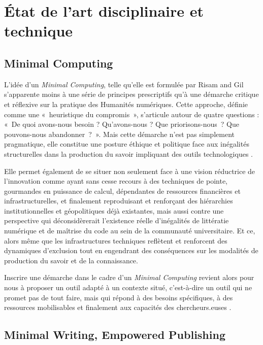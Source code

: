 \documentclass[final, fra]{anthology-ch}      %
\begin{document}
\section{État de l'art disciplinaire et
technique}\label{uxe9tat-de-lart-disciplinaire-et-technique}

\subsection{Minimal Computing}\label{minimal-computing}

L'idée d'un \emph{Minimal Computing}, telle qu'elle est formulée par
Risam and Gil \cite{risamIntroductionQuestionsMinimal2022} s'apparente
moins à une série de principes prescriptifs qu'à une démarche critique
et réflexive sur la pratique des Humanités numériques. Cette approche,
définie comme une «~heuristique du compromis~», s'articule autour de
quatre questions : «~De quoi avons-nous besoin ? Qu'avons-nous ? Que
priorisons-nous~? Que pouvons-nous abandonner~?~». Mais cette
démarche n'est pas simplement pragmatique, elle constitue une posture
éthique et politique face aux inégalités structurelles dans la
production du savoir impliquant des outils technologiques \cite{wrisleyEnactingOpenScholarship2019}.

Elle permet également de se situer non seulement face à une vision
réductrice de l'innovation comme ayant sans cesse recours à des
techniques de pointe, gourmandes en puissance de calcul, dépendantes de
ressources financières et infrastructurelles, et finalement reproduisant
et renforçant des hiérarchies institutionnelles et géopolitiques déjà
existantes, mais aussi contre une perspective qui déconsidèrerait
l'existence réelle d'inégalités de littératie numérique et de maîtrise
du code au sein de la communauté universitaire. Et ce, alors même que
les infrastructures techniques reflètent et renforcent des dynamiques
d'exclusion tout en engendrant des conséquences sur les modalités de
production du savoir et de la connaissance.

Inscrire une démarche dans le cadre d'un \emph{Minimal Computing}
revient alors pour nous à proposer un outil adapté à un contexte situé,
c'est-à-dire un outil qui ne promet pas de tout faire, mais qui répond à
des besoins spécifiques, à des ressources mobilisables et finalement aux
capacités des chercheurs.euses \cite{vitali-rosatiElogeBugEtre2024}.

\subsection{Minimal Writing, Empowered
Publishing}\label{minimal-writing-empowered-publishing}
\end{document}
